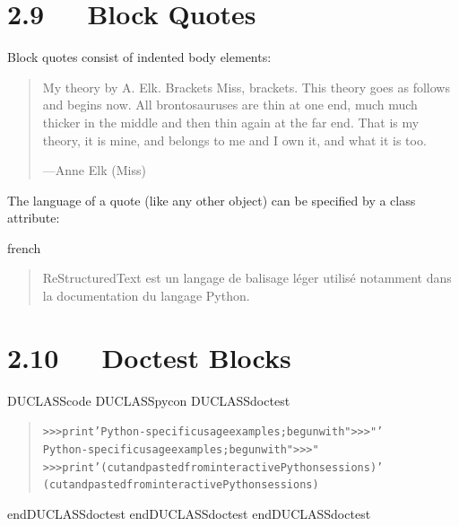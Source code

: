 \documentclass[a4paper]{memoir}
\newenvironment{DUclass}[1]%
    {%
     \def\DocutilsClassFunctionName{DUCLASS#1}
     \csname \DocutilsClassFunctionName \endcsname}%
    {\csname end\DocutilsClassFunctionName \endcsname}%
\begin{document}
\section{2.9   Block Quotes}

Block quotes consist of indented body elements:

\begin{quote}
My theory by A. Elk.  Brackets Miss, brackets.  This theory goes
as follows and begins now.  All brontosauruses are thin at one
end, much much thicker in the middle and then thin again at the
far end.  That is my theory, it is mine, and belongs to me and I
own it, and what it is too.
\nopagebreak

\raggedleft —Anne Elk (Miss)
\end{quote}

The language of a quote (like any other object) can be specified by
a class attribute:

% 

\begin{selectlanguage}{french}
\begin{quote}
ReStructuredText est un langage de balisage léger utilisé
notamment dans la documentation du langage Python.
\end{quote}
\end{selectlanguage}


\section{2.10   Doctest Blocks}

\begin{DUclass}{code}
\begin{DUclass}{pycon}
\begin{DUclass}{doctest}
\begin{quote}
\begin{alltt}
>>> print 'Python-specific usage examples; begun with ">>>"'
Python-specific usage examples; begun with ">>>"
>>> print '(cut and pasted from interactive Python sessions)'
(cut and pasted from interactive Python sessions)
\end{alltt}
\end{quote}
\end{DUclass}
\end{DUclass}
\end{DUclass}
\end{document}
